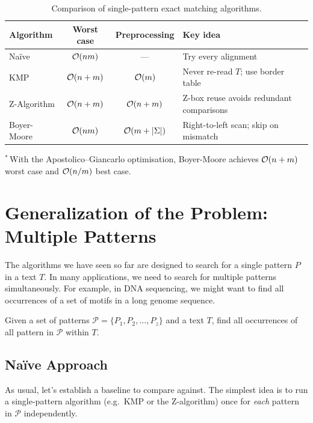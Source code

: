 \begin{table}[H]
\centering
\renewcommand{\arraystretch}{1.3}
\begin{tabular}{l c c l}
  \toprule
  \textbf{Algorithm} & \textbf{Worst case} & \textbf{Preprocessing} & \textbf{Key idea} \\
  \midrule
  Naïve             & $\mathcal{O}\!\left(nm\right)$   & ---         & Try every alignment \\
  KMP               & $\mathcal{O}\!\left(n+m\right)$  & $\mathcal{O}\!\left(m\right)$    & Never re-read $T$; use border table \\
  Z-Algorithm       & $\mathcal{O}\!\left(n+m\right)$  & $\mathcal{O}\!\left(n+m\right)$  & Z-box reuse avoids redundant comparisons \\
  Boyer-Moore       & $\mathcal{O}\!\left(nm\right)$\rlap{$^*$}  & $\mathcal{O}\!\left(m+|\Sigma|\right)$ & Right-to-left scan; skip on mismatch \\
  \bottomrule
\end{tabular}
\smallskip

{\footnotesize $^*$\,With the Apostolico--Giancarlo optimisation,
Boyer-Moore achieves $\mathcal{O}\!\left(n+m\right)$ worst case and $\mathcal{O}\!\left(n/m\right)$ best case.}
\caption{Comparison of single-pattern exact matching algorithms.}
\label{tab:single-pattern-summary}
\end{table}


\section{Generalization of the Problem: Multiple Patterns}
The algorithms we have seen so far are designed to search for a single pattern $P$ in a text $T$.
In many applications, we need to search for multiple patterns simultaneously.
For example, in DNA sequencing, we might want to find all occurrences of a set of motifs in a long genome sequence.

\begin{definition}
Given a set of patterns $\mathcal{P} = \{P_1, P_2, \ldots, P_z\}$ and a text $T$, find all occurrences of all pattern in $\mathcal{P}$ within $T$.
\end{definition}

\subsection{Naïve Approach}

As usual, let's establish a baseline to compare against.
The simplest idea is to run a single-pattern algorithm (e.g.\ KMP or the
Z-algorithm) once for \emph{each} pattern in $\mathcal{P}$ independently.

